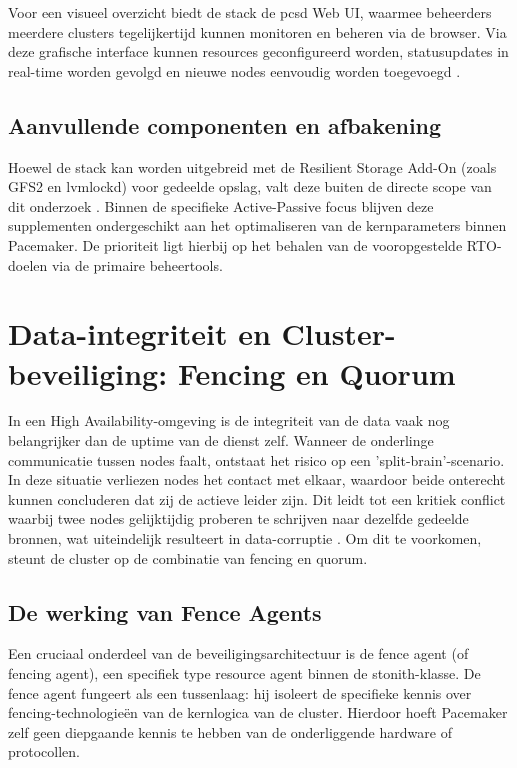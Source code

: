 Voor een visueel overzicht biedt de stack de pcsd Web UI, waarmee beheerders meerdere clusters tegelijkertijd kunnen monitoren en beheren via de browser. Via deze grafische interface kunnen resources geconfigureerd worden, statusupdates in real-time worden gevolgd en nieuwe nodes eenvoudig worden toegevoegd \autocite{RedHat2}.

\subsection{Aanvullende componenten en afbakening}
Hoewel de stack kan worden uitgebreid met de Resilient Storage Add-On (zoals GFS2 en lvmlockd) voor gedeelde opslag, valt deze buiten de directe scope van dit onderzoek \autocite{RedHat}. Binnen de specifieke Active-Passive focus blijven deze supplementen ondergeschikt aan het optimaliseren van de kernparameters binnen Pacemaker. De prioriteit ligt hierbij op het behalen van de vooropgestelde RTO-doelen via de primaire beheertools.

\section{Data-integriteit en Cluster-beveiliging: Fencing en Quorum}
In een High Availability-omgeving is de integriteit van de data vaak nog belangrijker dan de uptime van de dienst zelf. Wanneer de onderlinge communicatie tussen nodes faalt, ontstaat het risico op een 'split-brain'-scenario. In deze situatie verliezen nodes het contact met elkaar, waardoor beide onterecht kunnen concluderen dat zij de actieve leider zijn. Dit leidt tot een kritiek conflict waarbij twee nodes gelijktijdig proberen te schrijven naar dezelfde gedeelde bronnen, wat uiteindelijk resulteert in data-corruptie \autocite{Layrs2026}. Om dit te voorkomen, steunt de cluster op de combinatie van fencing en quorum.

\subsection{De werking van Fence Agents}
Een cruciaal onderdeel van de beveiligingsarchitectuur is de fence agent (of fencing agent), een specifiek type resource agent binnen de stonith-klasse. De fence agent fungeert als een tussenlaag: hij isoleert de specifieke kennis over fencing-technologieën van de kernlogica van de cluster. Hierdoor hoeft Pacemaker zelf geen diepgaande kennis te hebben van de onderliggende hardware of protocollen.

